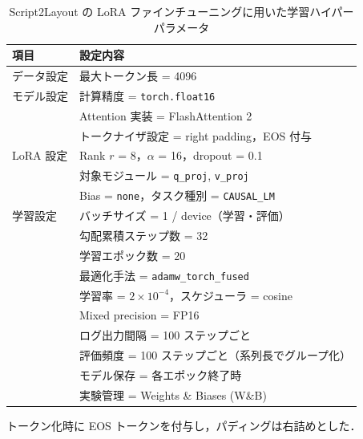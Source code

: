 \documentclass[a4j,12pt,dvipdfmx]{jsreport}
\begin{document}
\begin{table}[htbp]
  \centering
  \small
  \begin{threeparttable}
    \caption{Script2Layout の LoRA ファインチューニングに用いた学習ハイパーパラメータ}
    \label{tab:script2layout_hyperparams}
    \begin{tabular}{ll}
      \toprule
      \textbf{項目} & \textbf{設定内容}                      \\
      \midrule
      データ設定       &
      最大トークン長 = 4096                                   \\
      \midrule
      モデル設定       &
      計算精度 = \texttt{torch.float16}                    \\
                  &
      Attention 実装 = FlashAttention 2                  \\
                  &
      トークナイザ設定 = right padding，EOS 付与\tnote{a}         \\
      \midrule
      LoRA 設定     &
      Rank $r$ = 8，$\alpha$ = 16，dropout = 0.1         \\
                  &
      対象モジュール = \texttt{q\_proj}, \texttt{v\_proj}     \\
                  &
      Bias = \texttt{none}，タスク種別 = \texttt{CAUSAL\_LM} \\
      \midrule
      学習設定        &
      バッチサイズ = 1 / device（学習・評価）                       \\
                  &
      勾配累積ステップ数 = 32                                   \\
                  &
      学習エポック数 = 20                                     \\
                  &
      最適化手法 = \texttt{adamw\_torch\_fused}             \\
                  &
      学習率 = $2\times10^{-4}$，スケジューラ = cosine           \\
                  &
      Mixed precision = FP16                           \\
                  &
      ログ出力間隔 = 100 ステップごと                              \\
                  &
      評価頻度 = 100 ステップごと（系列長でグループ化）                     \\
                  &
      モデル保存 = 各エポック終了時                                 \\
                  &
      実験管理 = Weights \& Biases (W\&B)                  \\
      \bottomrule
    \end{tabular}
    \begin{tablenotes}[flushleft]
      \footnotesize
      \item[a] トークン化時に EOS トークンを付与し，パディングは右詰めとした．
    \end{tablenotes}
  \end{threeparttable}
\end{table}
\end{document}
